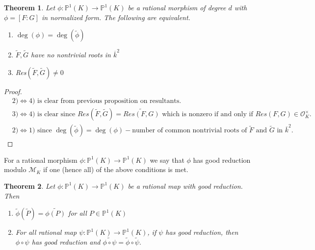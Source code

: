 \documentclass[12pt]{amsart}
\newtheorem{thm}{Theorem}[subsection]
\theoremstyle{definition}
\theoremstyle{remark}
\theoremstyle{definition}
\renewcommand{\P}{\mathbb{P}}
\newcommand{\MCM}{\mathcal{M}}
\newcommand{\MCO}{\mathcal{O}}
\begin{document}
\begin{thm}
Let $\phi: \mathbb{P}^1(K) \rightarrow \mathbb{P}^1(K)$ be a rational morphism of degree $d$ with $\phi=[F:G]$ in normalized form. 
The following are equivalent. 

\begin{enumerate}
\item $\deg(\phi)=\deg(\tilde{\phi})$
\item $\tilde{F}, \tilde{G}$ have no nontrivial roots in $\overline{k}^2$
\item Res$(\tilde{F},\tilde{G}) \neq 0$
\end{enumerate}


\end{thm}

\begin{proof}

\begin{align*}
& 2)\iff 4) \text{ is clear from previous proposition on resultants.} \\
& 3)\iff 4) \text{ is clear since } Res(\tilde{F}, \tilde{G})=\widetilde{Res(F,G)} \text{ which is nonzero if and only if } Res(F,G) \in \MCO_K^{\times}. \\
& 2)\iff 1) \text{ since } \deg(\tilde{\phi})=\deg(\phi) - \text{number of common nontrivial roots of }\tilde{F}\text{ and }\tilde{G}\text{ in } \overline{k}^2. 
\end{align*}

\end{proof}

For a rational morphism $\phi: \mathbb{P}^1(K) \rightarrow \mathbb{P}^1(K) $ we say that $\phi$ has good reduction modulo $\MCM_K$ if one (hence all) of the above conditions is met. 

\begin{thm}
Let $\phi:\mathbb{P}^1(K) \rightarrow \mathbb{P}^1(K) $ be a rational map with good reduction.  Then 
\begin{enumerate}
\item $\tilde{\phi}(\tilde{P})=\widetilde{\phi(P)}$ for all $P \in \P^1(K) $
\item For all rational map $\psi: \mathbb{P}^1(K)  \rightarrow \mathbb{P}^1(K) $, if $\psi$ has good reduction, then $\phi \circ \psi$ has good reduction and $\widetilde{\phi \circ \psi} = \tilde{\phi} \circ \tilde{\psi}. $
 
\end{enumerate}
\end{thm}
\end{document}
